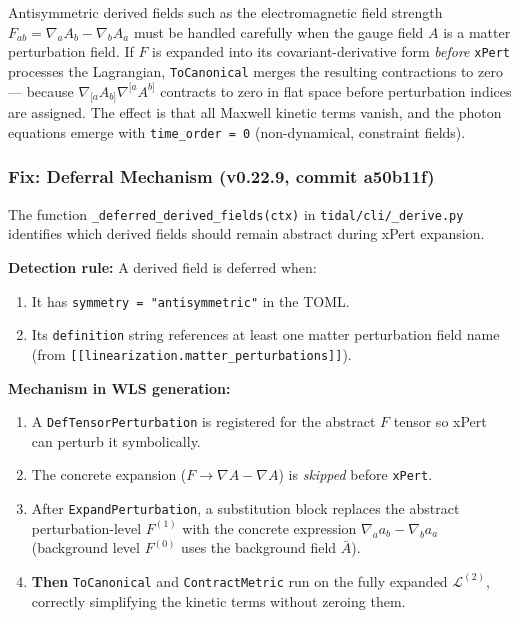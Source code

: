 Antisymmetric derived fields such as the electromagnetic field strength
$F_{ab} = \nabla_a A_b - \nabla_b A_a$ must be handled carefully when the
gauge field $A$ is a matter perturbation field.  If $F$ is expanded into its
covariant-derivative form \emph{before} \texttt{xPert} processes the Lagrangian,
\texttt{ToCanonical} merges the resulting contractions to zero --- because
$\nabla_{[a}A_{b]} \nabla^{[a}A^{b]}$ contracts to zero in flat space before
perturbation indices are assigned.  The effect is that all Maxwell kinetic terms
vanish, and the photon equations emerge with \texttt{time\_order = 0}
(non-dynamical, constraint fields).

\subsubsection{Fix: Deferral Mechanism (v0.22.9, commit a50b11f)}

The function \texttt{\_deferred\_derived\_fields(ctx)} in
\texttt{tidal/cli/\_derive.py} identifies which derived fields should remain
abstract during xPert expansion.

\textbf{Detection rule:} A derived field is deferred when:
\begin{enumerate}
  \item It has \texttt{symmetry = "antisymmetric"} in the TOML.
  \item Its \texttt{definition} string references at least one matter perturbation
    field name (from \texttt{[[linearization.matter\_perturbations]]}).
\end{enumerate}

\textbf{Mechanism in WLS generation:}
\begin{enumerate}
  \item A \texttt{DefTensorPerturbation} is registered for the abstract $F$ tensor
    so xPert can perturb it symbolically.
  \item The concrete expansion ($F \to \nabla A - \nabla A$) is \emph{skipped}
    before \texttt{xPert}.
  \item After \texttt{ExpandPerturbation}, a substitution block replaces the
    abstract perturbation-level $F^{(1)}$ with the concrete expression
    $\nabla_a a_b - \nabla_b a_a$ (background level $F^{(0)}$ uses the background
    field $\bar{A}$).
  \item \textbf{Then} \texttt{ToCanonical} and \texttt{ContractMetric} run on the
    fully expanded $\mathcal{L}^{(2)}$, correctly simplifying the kinetic terms
    without zeroing them.
\end{enumerate}

